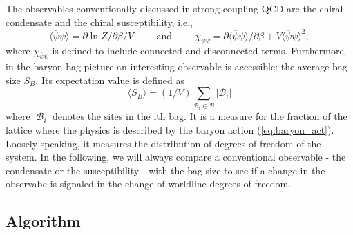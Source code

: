\documentclass{PoS}
\begin{document}
The observables conventionally discussed in strong coupling QCD are the chiral condensate and the chiral susceptibility, i.e.,
\begin{equation}
\langle \overline{\psi}\psi \rangle = \partial \ln Z/\partial \beta / V \hspace{1cm} \text{and} \hspace{1cm} \chi_{\overline{\psi}\psi} = \partial \langle\overline{\psi}\psi\rangle/\partial \beta + V\langle \overline{\psi}\psi \rangle^2,
\end{equation}
where $ \chi_{\overline{\psi}\psi}$ is defined to include connected and disconnected terms. Furthermore, in the baryon bag picture an interesting observable is accessible: the average bag size $S_B$. Its expectation value is defined as
\begin{equation}
\langle S_B \rangle = (1/V) \sum_{\mathcal{B}_i \in \mathcal{B}} |\mathcal{B}_i|
\end{equation}
where $|\mathcal{B}_i|$ denotes the sites in the ith bag. It is a measure for the fraction of the lattice where the physics is described by the baryon action (\ref{eq:baryon_act}). Loosely speaking, it measures the distribution of degrees of freedom of the system. In the following, we will always compare a conventional observable - the condensate or the susceptibility - with the bag size to see if a change in the observabe is signaled in the change of worldline degrees of freedom.
\subsection{Algorithm}
\end{document}
